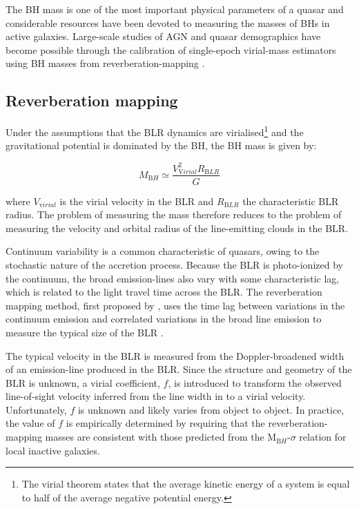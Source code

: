 The BH mass is one of the most important physical parameters of a quasar and considerable resources have been devoted to measuring the masses of BHs in active galaxies. 
Large-scale studies of AGN and quasar demographics have become possible through the calibration of single-epoch virial-mass estimators using BH masses from reverberation-mapping \citep[e.g.][]{peterson10,vestergaard11,marziani12,shen13}.  

\subsection{Reverberation mapping}

Under the assumptions that the BLR dynamics are virialised\footnote{The virial theorem states that the average kinetic energy of a system is equal to half of the average negative potential energy.} and the gravitational potential is dominated by the BH, the BH mass is given by:

\begin{equation}
M_{\mathrm BH} \simeq \frac{V_{\mathrm Virial}^2R_{\mathrm BLR}}{G} 
\end{equation}

where $V_{\mathrm virial}$ is the virial velocity in the BLR and $R_{\mathrm BLR}$ the characteristic BLR radius.
The problem of measuring the mass therefore reduces to the problem of measuring the velocity and orbital radius of the line-emitting clouds in the BLR. 

Continuum variability is a common characteristic of quasars, owing to the stochastic nature of the accretion process.  
Because the BLR is photo-ionized by the continuum, the broad emission-lines also vary with some characteristic lag, which is related to the light travel time across the BLR. 
The reverberation mapping method, first proposed by \citet{blandford82a}, uses the time lag between variations in the continuum emission and correlated variations in the broad line emission to measure the typical size of the BLR \citep[e.g.][]{peterson93,netzer97,peterson14}. 

The typical velocity in the BLR is measured from the Doppler-broadened width of an emission-line produced in the BLR. 
Since the structure and geometry of the BLR is unknown, a virial coefficient, $f$, is introduced to transform the observed line-of-sight velocity inferred from the line width in to a virial velocity.
Unfortunately, $f$ is unknown and likely varies from object to object.  
In practice, the value of $f$ is empirically determined by requiring that the reverberation-mapping masses are consistent with those predicted from the M$_{\mathrm BH}$-$\sigma$ relation for local inactive galaxies. 

